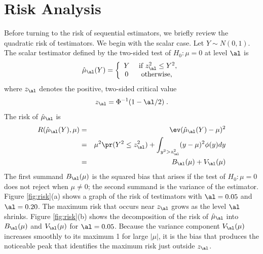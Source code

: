 \documentclass[12pt]{article}
\begin{document}



\section{ Risk Analysis}


 Before turning to the risk of sequential estimators, we briefly review the
 quadratic risk of testimators.  We begin with the scalar case.  Let $Y \sim
 N(0,1)$.  The scalar testimator defined by the two-sided test of $H_0: \mu=0$
 at level $\al$ is
 \begin{equation}
   \hat\mu_\al(Y) = \left\{
     \begin{array}{cc}
        Y & \mbox{ if } z_\al^2 \le Y^2, \cr
        0 & \mbox{ otherwise, }
      \end{array} \right.
 \label{eq:muHat}
 \end{equation}
 where $z_\al$ denotes the positive, two-sided critical value
 \begin{equation}
   z_\al = \Phi^{-1}(1-\al/2) \;.
 \label{eq:zAlpha}
 \end{equation}
 The risk of $\hat\mu_\al$ is
 \begin{eqnarray}
   R(\hat\mu_\al(Y), \mu) 
     &=& \ev(\hat\mu_\al(Y) - \mu)^2  \cr
     &=& \mu^2 \pr(Y^2 \le z_\al^2) 
         + \int_{y^2>z_\al^2} (y-\mu)^2 \phi(y) dy \cr
     &=& B_\al(\mu) + V_\al(\mu)
 \label{eq:risk_mu_al}
 \end{eqnarray}
 The first summand $B_\al(\mu)$ is the squared bias that arises if the test of
 $H_0: \mu=0$ does not reject when $\mu \ne 0$; the second summand is the
 variance of the estimator.  Figure \ref{fig:risk}(a) shows a graph of the risk
 of testimators with $\al=0.05$ and $\al = 0.20$.  The maximum risk that occurs
 near $z_\al$ grows as the level $\al$ shrinks.  Figure \ref{fig:risk}(b) shows
 the decomposition of the risk of $\hat\mu_\al$ into $B_\al(\mu)$ and
 $V_\al(\mu)$ for $\al = 0.05$.  Because the variance component $V_\al(\mu)$
 increases smoothly to its maximum 1 for large $|\mu|$, it is the bias that
 produces the noticeable peak that identifies the maximum risk just outside
 $z_\al$.
\end{document}
